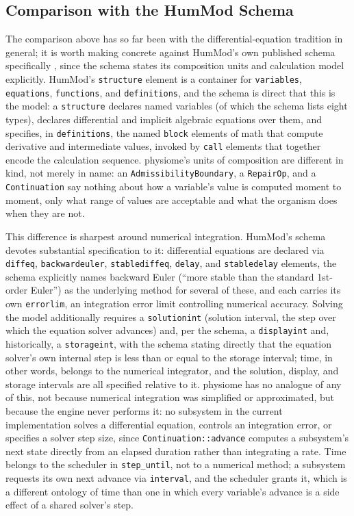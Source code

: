\documentclass[11pt]{article}
\begin{document}
\subsection{Comparison with the HumMod Schema}

The comparison above has so far been with the differential-equation tradition in general; it is worth making concrete against HumMod's own published schema specifically \cite{hummodschema}, since the schema states its composition units and calculation model explicitly. HumMod's \texttt{structure} element is a container for \texttt{variables}, \texttt{equations}, \texttt{functions}, and \texttt{definitions}, and the schema is direct that this is the model: a \texttt{structure} declares named variables (of which the schema lists eight types), declares differential and implicit algebraic equations over them, and specifies, in \texttt{definitions}, the named \texttt{block} elements of math that compute derivative and intermediate values, invoked by \texttt{call} elements that together encode the calculation sequence. physiome's units of composition are different in kind, not merely in name: an \texttt{AdmissibilityBoundary}, a \texttt{RepairOp}, and a \texttt{Continuation} say nothing about how a variable's value is computed moment to moment, only what range of values are acceptable and what the organism does when they are not.

This difference is sharpest around numerical integration. HumMod's schema devotes substantial specification to it: differential equations are declared via \texttt{diffeq}, \texttt{backwardeuler}, \texttt{stablediffeq}, \texttt{delay}, and \texttt{stabledelay} elements, the schema explicitly names backward Euler (``more stable than the standard 1st-order Euler'') as the underlying method for several of these, and each carries its own \texttt{errorlim}, an integration error limit controlling numerical accuracy. Solving the model additionally requires a \texttt{solutionint} (solution interval, the step over which the equation solver advances) and, per the schema, a \texttt{displayint} and, historically, a \texttt{storageint}, with the schema stating directly that the equation solver's own internal step is less than or equal to the storage interval; time, in other words, belongs to the numerical integrator, and the solution, display, and storage intervals are all specified relative to it. physiome has no analogue of any of this, not because numerical integration was simplified or approximated, but because the engine never performs it: no subsystem in the current implementation solves a differential equation, controls an integration error, or specifies a solver step size, since \texttt{Continuation::advance} computes a subsystem's next state directly from an elapsed duration rather than integrating a rate. Time belongs to the scheduler in \texttt{step\_until}, not to a numerical method; a subsystem requests its own next advance via \texttt{interval}, and the scheduler grants it, which is a different ontology of time than one in which every variable's advance is a side effect of a shared solver's step.
\end{document}
